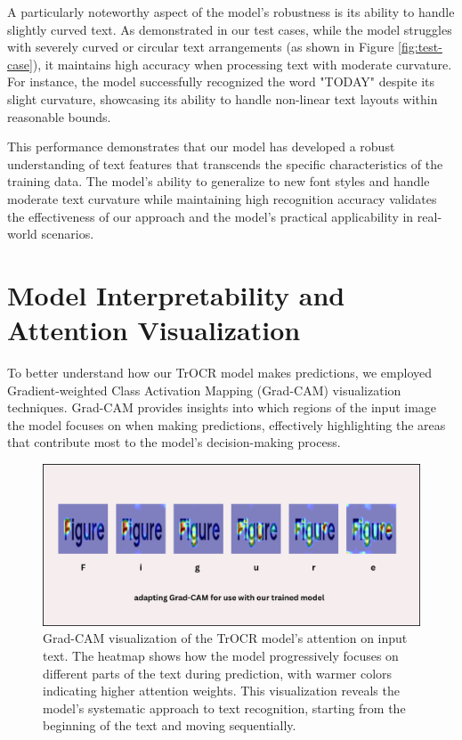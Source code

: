 A particularly noteworthy aspect of the model's robustness is its ability to handle slightly 
curved text. As demonstrated in our test cases, while the model struggles with severely 
curved or circular text arrangements (as shown in Figure \ref{fig:test-case}), it maintains 
high accuracy when processing text with moderate curvature. For instance, the model 
successfully recognized the word "TODAY" despite its slight curvature, showcasing 
its ability to handle non-linear text layouts within reasonable bounds.

This performance demonstrates that our model has developed a robust understanding of text 
features that transcends the specific characteristics of the training data. The model's 
ability to generalize to new font styles and handle moderate text curvature while 
maintaining high recognition accuracy validates the effectiveness of our approach 
and the model's practical applicability in real-world scenarios.
\section{Model Interpretability and Attention Visualization}
\label{sec:interpretability}

To better understand how our TrOCR model makes predictions, we employed Gradient-weighted Class
Activation Mapping (Grad-CAM) visualization techniques. Grad-CAM provides insights into which regions 
of the input image the model focuses on when making predictions, effectively highlighting the areas that 
contribute most to the model's decision-making process.

\begin{figure}[ht]
    \centering
    \includegraphics[width=\textwidth]{figures/grad_cam_figure.png}
    \caption{Grad-CAM visualization of the TrOCR model's attention on input text. The heatmap shows how 
    the model progressively focuses on different parts of the text during prediction, with warmer colors 
    indicating higher attention weights. This visualization reveals the model's systematic approach to text 
    recognition, starting from the beginning of the text and moving sequentially.}
    \label{fig:grad_cam}
\end{figure}

